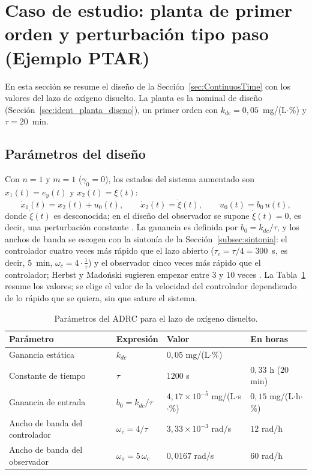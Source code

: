 \section{Caso de estudio: planta de primer orden y perturbación tipo paso (Ejemplo PTAR)}
\label{subsec:caso_n1}

En esta sección se resume el diseño de la Sección~\ref{sec:ContinuosTime} con los
valores del lazo de oxígeno disuelto. La planta es la nominal de diseño
(Sección~\ref{sec:ident_planta_diseno}), un primer orden con
$k_{dc} = 0{,}05$~mg/(L$\cdot$\%) y $\tau = 20$~min.

\subsection{Parámetros del diseño}
\label{subsec:caso_parametros}

Con $n = 1$ y $m = 1$ ($\gamma_0 = 0$), los estados del sistema aumentado son
$x_1(t) = e_y(t)$ y $x_2(t) = \xi(t)$:
\begin{equation}
\dot{x}_1(t) = x_2(t) + u_0(t), \qquad \dot{x}_2(t) = \dot{\xi}(t), \qquad u_0(t) = b_0\,u(t) ,
\end{equation}
donde $\dot{\xi}(t)$ es desconocida; en el diseño del observador se supone
$\dot{\xi}(t) = 0$, es decir, una perturbación constante 
\cite[sec.~3.1]{herbst2024adrc}. La ganancia es definida por $b_0 = k_{dc}/\tau$, y los anchos de banda se escogen con la
sintonía de la Sección~\ref{subsec:sintonia}: el controlador cuatro veces más
rápido que el lazo abierto ($\tau_c = \tau/4 = 300$~s, es decir, 5~min, $\omega_c=4\cdot\frac{1}{\tau}$) y el observador cinco veces
más rápido que el controlador; Herbst y Madoński sugieren empezar entre $3$ y $10$ veces
\cite[sec.~3.3]{herbst2024adrc}. La Tabla~\ref{tab:caso_parametros} resume los
valores; se elige el valor de la velocidad del controlador dependiendo de lo rápido que se quiera, sin que sature el sistema. 

\begin{table}[H]
\centering
\caption{Parámetros del ADRC para el lazo de oxígeno disuelto.}
\label{tab:caso_parametros}
\small
\begin{tabular}{llll}
\toprule
\textbf{Parámetro} & \textbf{Expresión} & \textbf{Valor} & \textbf{En horas} \\
\midrule
Ganancia estática & $k_{dc}$ & $0{,}05$ mg/(L$\cdot$\%) & \\
Constante de tiempo & $\tau$ & $1200$ s & $0{,}33$ h ($20$ min) \\
Ganancia de entrada & $b_0 = k_{dc}/\tau$ & $4{,}17\times10^{-5}$ mg/(L$\cdot$s$\cdot$\%) & $0{,}15$ mg/(L$\cdot$h$\cdot$\%) \\
Ancho de banda del controlador & $\omega_c = 4/\tau$ & $3{,}33\times10^{-3}$ rad/s & $12$ rad/h \\
Ancho de banda del observador & $\omega_o = 5\,\omega_c$ & $0{,}0167$ rad/s & $60$ rad/h \\
\bottomrule
\end{tabular}
\end{table}

